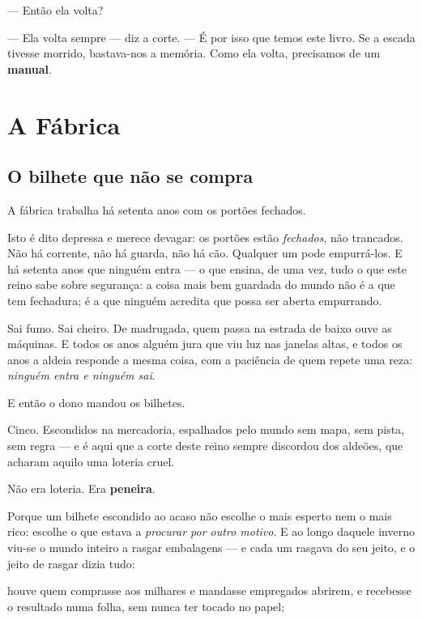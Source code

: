 \documentclass[livro.tex]{subfiles}
\begin{document}
--- Então ela volta?

--- Ela volta sempre --- diz a corte. --- É por isso que temos este livro. Se a escada
tivesse morrido, bastava-nos a memória. Como ela volta, precisamos de um
\textbf{manual}.


\part{A Fábrica}

\chapter{O bilhete que não se compra}

A fábrica trabalha há setenta anos com os portões fechados.

Isto é dito depressa e merece devagar: os portões estão \emph{fechados}, não trancados.
Não há corrente, não há guarda, não há cão. Qualquer um pode empurrá-los. E há setenta
anos que ninguém entra --- o que ensina, de uma vez, tudo o que este reino sabe sobre
segurança: a coisa mais bem guardada do mundo não é a que tem fechadura; é a que ninguém
acredita que possa ser aberta empurrando.

Sai fumo. Sai cheiro. De madrugada, quem passa na estrada de baixo ouve as máquinas. E
todos os anos alguém jura que viu luz nas janelas altas, e todos os anos a aldeia responde
a mesma coisa, com a paciência de quem repete uma reza: \emph{ninguém entra e ninguém
sai}.

\medskip

E então o dono mandou os bilhetes.

Cinco. Escondidos na mercadoria, espalhados pelo mundo sem mapa, sem pista, sem regra ---
e é aqui que a corte deste reino sempre discordou dos aldeões, que acharam aquilo uma
loteria cruel.

Não era loteria. Era \textbf{peneira}.

Porque um bilhete escondido ao acaso não escolhe o mais esperto nem o mais rico: escolhe
o que estava a \emph{procurar por outro motivo}. E ao longo daquele inverno viu-se o mundo
inteiro a rasgar embalagens --- e cada um rasgava do seu jeito, e o jeito de rasgar dizia
tudo:

houve quem comprasse aos milhares e mandasse empregados abrirem, e recebesse o resultado
numa folha, sem nunca ter tocado no papel;
\end{document}

